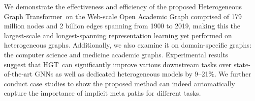 \documentclass[sigconf]{acmart}
\theoremstyle{definition}
\newcommand{\model}{Heterogeneous Graph Transformer}
\newcommand{\short}{HGT}
\begin{document}
We demonstrate the effectiveness and efficiency of the proposed \model\ on the Web-scale Open Academic Graph comprised of 179 million nodes and 2 billion edges spanning from 1900 to 2019, making this the largest-scale
and longest-spanning representation learning yet performed on heterogeneous graphs. 
Additionally, we also examine it on domain-specific graphs: the computer science and medicine academic graphs. 
Experimental results suggest that \short\ can significantly improve various downstream tasks over state-of-the-art GNNs as well as dedicated heterogeneous models by 9--21$\%$. 
We further conduct case studies to show the proposed method can indeed  automatically capture the importance of implicit meta paths for different tasks. 



 
\end{document}
